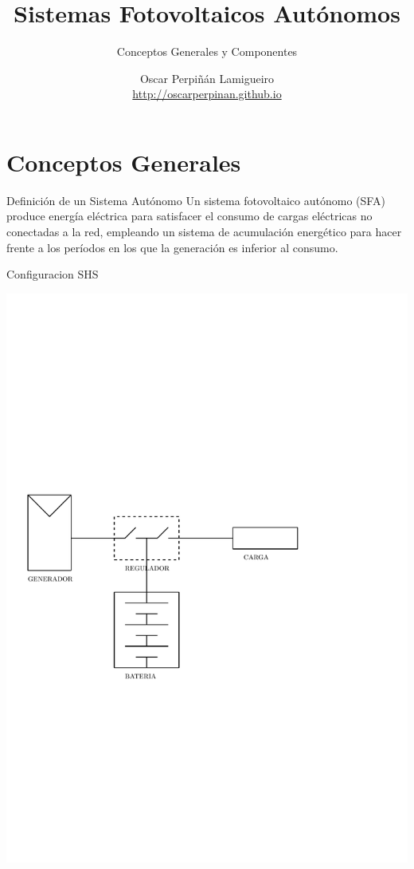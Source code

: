\documentclass[xcolor={usenames,svgnames,dvipsnames}]{beamer}
\author{Oscar Perpiñán Lamigueiro \\ \url{http://oscarperpinan.github.io}}
\date{}
\title{Sistemas Fotovoltaicos Autónomos}
\subtitle{Conceptos Generales y Componentes}
\begin{document}
\maketitle

\section{Conceptos Generales}
\label{sec:orgba2c4d4}

\begin{frame}[label={sec:orge1db5ef}]{Definición de un Sistema Autónomo}
Un sistema fotovoltaico autónomo (SFA) produce energía eléctrica para \alert{satisfacer el consumo de cargas eléctricas no conectadas a la red}, \alert{empleando un sistema de acumulación energético} para hacer frente a los períodos en los que la generación es inferior al consumo.
\end{frame}

\begin{frame}[label={sec:org0356d8c}]{Configuracion SHS}
\begin{center}
\includegraphics[width=.9\linewidth]{../figs/DiagramaUnifilarER_DC.pdf}
\end{center}
\end{frame}
\end{document}
